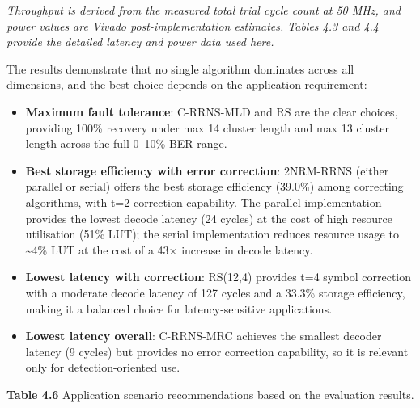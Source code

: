 \emph{Throughput is derived from the measured total trial cycle count at
50 MHz, and power values are Vivado post-implementation estimates.
Tables 4.3 and 4.4 provide the detailed latency and power data used
here.}

The results demonstrate that no single algorithm dominates across all
dimensions, and the best choice depends on the application requirement:

\begin{itemize}
\item
  \textbf{Maximum fault tolerance}: C-RRNS-MLD and RS are the clear
  choices, providing 100\% recovery under max 14 cluster length and max
  13 cluster length across the full 0--10\% BER range.
\item
  \textbf{Best storage efficiency with error correction}: 2NRM-RRNS
  (either parallel or serial) offers the best storage efficiency
  (39.0\%) among correcting algorithms, with t=2 correction capability.
  The parallel implementation provides the lowest decode latency (24
  cycles) at the cost of high resource utilisation (51\% LUT); the
  serial implementation reduces resource usage to \textasciitilde4\% LUT
  at the cost of a 43× increase in decode latency.
\item
  \textbf{Lowest latency with correction}: RS(12,4) provides t=4 symbol
  correction with a moderate decode latency of 127 cycles and a 33.3\%
  storage efficiency, making it a balanced choice for latency-sensitive
  applications.
\item
  \textbf{Lowest latency overall}: C-RRNS-MRC achieves the smallest
  decoder latency (9 cycles) but provides no error correction
  capability, so it is relevant only for detection-oriented use.
\end{itemize}

\textbf{Table 4.6} Application scenario recommendations based on the
evaluation results.


